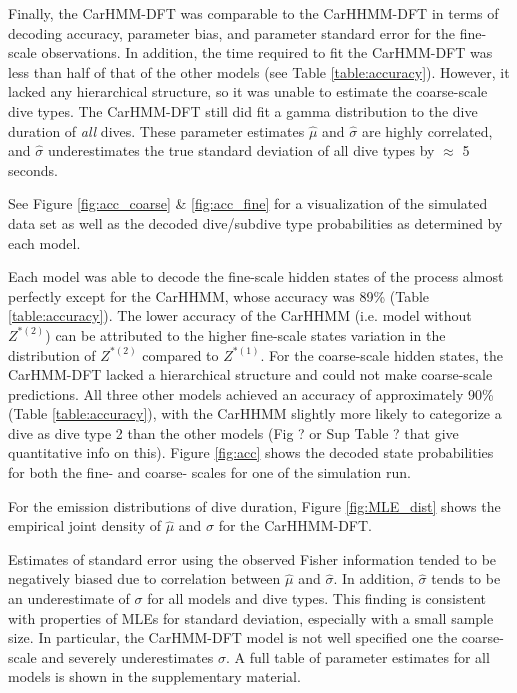 Finally, the CarHMM-DFT was comparable to the CarHHMM-DFT in terms of decoding accuracy, parameter bias, and parameter standard error for the fine-scale observations. In addition, the time required to fit the CarHMM-DFT was less than half of that of the other models (see Table \ref{table:accuracy}). However, it lacked any hierarchical structure, so it was unable to estimate the coarse-scale dive types. The CarHMM-DFT still did fit a gamma distribution to the dive duration of \textit{all} dives. These parameter estimates $\hat \mu$ and $\hat \sigma$ are highly correlated, and $\hat \sigma$ underestimates the true standard deviation of all dive types by $\approx$ 5 seconds.

See Figure \ref{fig:acc_coarse} \& \ref{fig:acc_fine} for a visualization of the simulated data set as well as the decoded dive/subdive type probabilities as determined by each model.






\iffalse
Each model was able to decode the fine-scale hidden states of the process almost perfectly except for the CarHHMM, whose accuracy was 89\% (Table \ref{table:accuracy}). The lower accuracy of the CarHHMM (i.e. model without $Z^{*(2)}$)  can be attributed to the higher fine-scale states variation in the distribution of $Z^{*(2)}$ compared to $Z^{*(1)}$. For the coarse-scale hidden states, the CarHMM-DFT lacked a hierarchical structure and could not make coarse-scale predictions. All three other models achieved an accuracy of approximately 90\% (Table \ref{table:accuracy}), with the CarHHMM slightly more likely to categorize a dive as dive type 2 than the other models (Fig ? or Sup Table ? that give quantitative info on this). Figure \ref{fig:acc} shows the decoded state probabilities for both the fine- and coarse- scales for one of the simulation run.

For the emission distributions of dive duration, Figure \ref{fig:MLE_dist} shows the empirical joint density of $\hat \mu$ and $\hat \sigma$ for the CarHHMM-DFT.

Estimates of standard error using the observed Fisher information tended to be negatively biased due to correlation between $\hat \mu$ and $\hat \sigma$. In addition, $\hat \sigma$ tends to be an underestimate of $\sigma$ for all models and dive types. This finding is consistent with properties of MLEs for standard deviation, especially with a small sample size. In particular, the CarHMM-DFT model is not well specified one the coarse-scale and severely underestimates $\sigma$. %
A full table of parameter estimates for all models is shown in the supplementary material.



